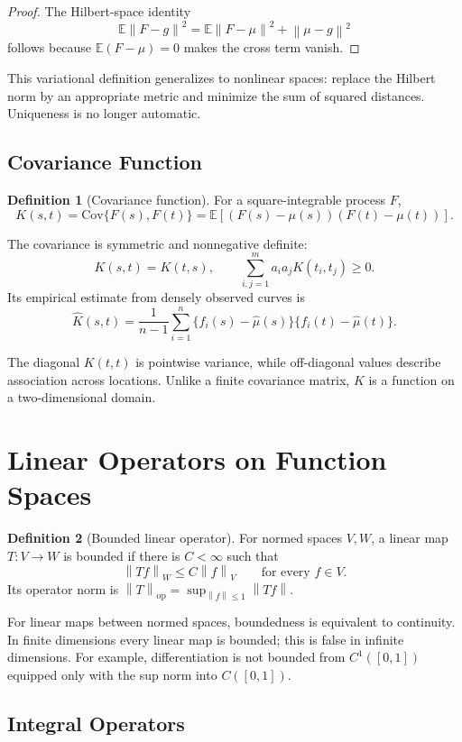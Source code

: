\documentclass[12pt,oneside]{book}
\numberwithin{equation}{section}
\theoremstyle{definition}
\newtheorem{definition}{Definition}[section]
\theoremstyle{plain}
\theoremstyle{remark}
\newcommand{\E}{\mathbb{E}}
\newcommand{\Cov}{\mathrm{Cov}}
\newcommand{\norm}[1]{\left\lVert #1 \right\rVert}
\begin{document}
\begin{proof}
The Hilbert-space identity
\[
 \E\norm{F-g}^2
 =\E\norm{F-\mu}^2+\norm{\mu-g}^2
\]
follows because $\E(F-\mu)=0$ makes the cross term vanish.
\end{proof}

This variational definition generalizes to nonlinear spaces: replace the
Hilbert norm by an appropriate metric and minimize the sum of squared
distances. Uniqueness is no longer automatic.

\subsection{Covariance Function}

\begin{definition}[Covariance function]
For a square-integrable process $F$,
\[
    K(s,t)=\Cov\{F(s),F(t)\}
    =\E[(F(s)-\mu(s))(F(t)-\mu(t))].
\]
\end{definition}

The covariance is symmetric and nonnegative definite:
\[
 K(s,t)=K(t,s),\qquad
 \sum_{i,j=1}^ma_ia_jK(t_i,t_j)\geq0.
\]
Its empirical estimate from densely observed curves is
\[
    \widehat K(s,t)=\frac1{n-1}\sum_{i=1}^n
    \{f_i(s)-\widehat\mu(s)\}\{f_i(t)-\widehat\mu(t)\}.
\]

The diagonal $K(t,t)$ is pointwise variance, while off-diagonal values
describe association across locations. Unlike a finite covariance matrix,
$K$ is a function on a two-dimensional domain.

\section{Linear Operators on Function Spaces}

\begin{definition}[Bounded linear operator]
For normed spaces $V,W$, a linear map $T:V\to W$ is bounded if there is
$C<\infty$ such that
\[
    \norm{Tf}_W\leq C\norm f_V\qquad\text{for every }f\in V.
\]
Its operator norm is
$\norm T_{\mathrm{op}}=\sup_{\norm f\leq1}\norm{Tf}$.
\end{definition}

For linear maps between normed spaces, boundedness is equivalent to
continuity. In finite dimensions every linear map is bounded; this is false
in infinite dimensions. For example, differentiation is not bounded from
$C^1([0,1])$ equipped only with the sup norm into $C([0,1])$.

\subsection{Integral Operators}
\end{document}
